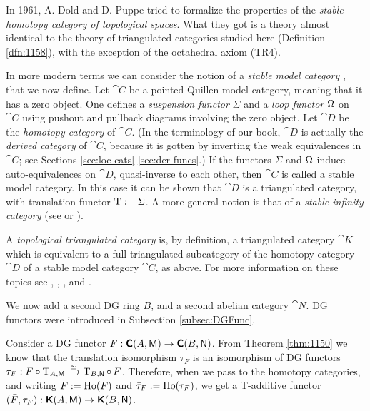\begin{rem} \label{rem:4920}
In 1961, A. Dold and D. Puppe \cite{DoPu} tried to formalize the properties 
of the {\em stable homotopy category of topological spaces}. What they got is a 
theory almost identical to the theory of triangulated categories studied here 
(Definition \ref{dfn:1158}), with the exception of the octahedral axiom (TR4). 

In more modern terms we can consider the notion of a 
{\em stable model category}%
, 
that we now define. Let $\cat{C}$ be a pointed Quillen model category, meaning 
that it has a zero object. One defines a {\em suspension functor} $\Sigma$ and a 
{\em loop functor} $\Omega$ on $\cat{C}$ using pushout and pullback diagrams 
involving the zero object. Let $\cat{D}$ be the {\em homotopy category} of 
$\cat{C}$. (In the terminology of our book, $\cat{D}$ is actually the {\em 
derived category} of $\cat{C}$, because it is gotten by inverting the weak 
equivalences in $\cat{C}$; see Sections 
\ref{sec:loc-cats}-\ref{sec:der-funcs}.) If the functors 
$\Sigma$ and $\Omega$ induce auto-equivalences on $\cat{D}$, quasi-inverse to each 
other, then $\cat{C}$ is called a stable model category. In this case it can be 
shown that $\cat{D}$ is a triangulated category, with translation functor 
$\operatorname{T} := \Sigma$.
A more general notion is that of a {\em stable infinity category}
(see \cite{Lur2} or \cite{Hi2}). 

A {\em topological triangulated category} is, by definition, a triangulated 
category $\cat{K}$ which is equivalent to a full triangulated subcategory 
of the homotopy category $\cat{D}$ of a stable model category $\cat{C}$, as 
above. For more information on these topics see \cite{Ho1}, \cite{Sch}, 
\cite{ShSc}, \cite{Lur2} and \cite{CaSt}. 
\end{rem}

\newpage



\label{subsec:DG-to-tri-fun}

We now add a second DG ring $B$, and a second abelian category $\cat{N}$.
DG functors were introduced in Subsection \ref{subsec:DGFunc}.

Consider a DG functor 
$F  : \boldsymbol{\mathsf{C}}(A, \operatorname{\mathsf{M}}) \to \boldsymbol{\mathsf{C}}(B, \operatorname{\mathsf{N}})$.
From Theorem \ref{thm:1150} we know that the translation isomorphism $\tau_F$ 
is an isomorphism of DG functors
$\tau_F : F \circ \operatorname{T}_{A, \operatorname{\mathsf{M}}} \xrightarrow{\simeq} 
\operatorname{T}_{B, \operatorname{\mathsf{N}}} \circ \, F$.
Therefore, when we pass to the homotopy categories, 
and writing $\bar{F} := \operatorname{Ho}(F)$
and $\bar{\tau}_F := \operatorname{Ho}(\tau_F)$,
we get a T-additive functor 
$(\bar{F}, \bar{\tau}_F): \boldsymbol{\mathsf{K}}(A, \operatorname{\mathsf{M}}) \to \boldsymbol{\mathsf{K}}(B, \operatorname{\mathsf{N}})$.

